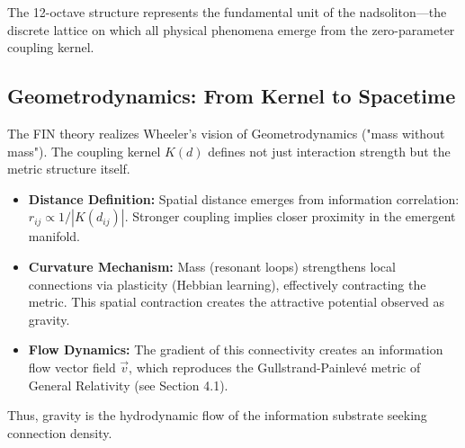 \documentclass[11pt, a4paper]{article}
\begin{document}
The 12-octave structure represents the fundamental unit of the nadsoliton—the discrete lattice on which all physical phenomena emerge from the zero-parameter coupling kernel.

\subsection{Geometrodynamics: From Kernel to Spacetime}
The FIN theory realizes Wheeler's vision of Geometrodynamics ("mass without mass"). The coupling kernel $K(d)$ defines not just interaction strength but the metric structure itself.
\begin{itemize}
    \item \textbf{Distance Definition:} Spatial distance emerges from information correlation: $r_{ij} \propto 1/|K(d_{ij})|$. Stronger coupling implies closer proximity in the emergent manifold.
    \item \textbf{Curvature Mechanism:} Mass (resonant loops) strengthens local connections via plasticity (Hebbian learning), effectively contracting the metric. This spatial contraction creates the attractive potential observed as gravity.
    \item \textbf{Flow Dynamics:} The gradient of this connectivity creates an information flow vector field $\vec{v}$, which reproduces the Gullstrand-Painlevé metric of General Relativity (see Section 4.1).
\end{itemize}
Thus, gravity is the hydrodynamic flow of the information substrate seeking connection density.
\end{document}
